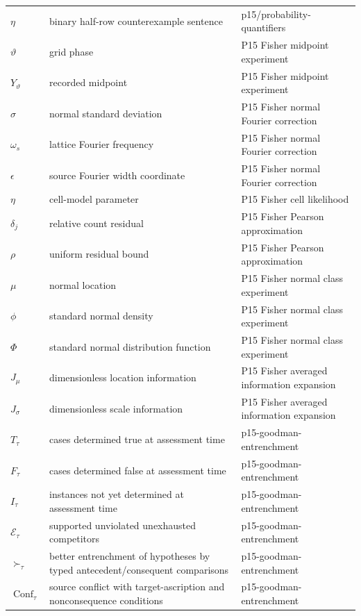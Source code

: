 \begin{longtable}{@{}p{}p{}p{}@{}}
\(\eta\) & binary half-row counterexample sentence & p15/\allowbreak{}probability-\allowbreak{}quantifiers \\
\(\vartheta\) & grid phase & P15 Fisher midpoint experiment \\
\(Y_\vartheta\) & recorded midpoint & P15 Fisher midpoint experiment \\
\(\sigma\) & normal standard deviation & P15 Fisher normal Fourier correction \\
\(\omega_s\) & lattice Fourier frequency & P15 Fisher normal Fourier correction \\
\(\epsilon\) & source Fourier width coordinate & P15 Fisher normal Fourier correction \\
\(\eta\) & cell-model parameter & P15 Fisher cell likelihood \\
\(\delta_j\) & relative count residual & P15 Fisher Pearson approximation \\
\(\rho\) & uniform residual bound & P15 Fisher Pearson approximation \\
\(\mu\) & normal location & P15 Fisher normal class experiment \\
\(\phi\) & standard normal density & P15 Fisher normal class experiment \\
\(\Phi\) & standard normal distribution function & P15 Fisher normal class experiment \\
\(J_\mu\) & dimensionless location information & P15 Fisher averaged information expansion \\
\(J_\sigma\) & dimensionless scale information & P15 Fisher averaged information expansion \\
\(T_\tau\) & cases determined true at assessment time & p15-\allowbreak{}goodman-\allowbreak{}entrenchment \\
\(F_\tau\) & cases determined false at assessment time & p15-\allowbreak{}goodman-\allowbreak{}entrenchment \\
\(I_\tau\) & instances not yet determined at assessment time & p15-\allowbreak{}goodman-\allowbreak{}entrenchment \\
\(\mathcal E_\tau\) & supported unviolated unexhausted competitors & p15-\allowbreak{}goodman-\allowbreak{}entrenchment \\
\(\succ_\tau\) & better entrenchment of hypotheses by typed antecedent/consequent comparisons & p15-\allowbreak{}goodman-\allowbreak{}entrenchment \\
\(\operatorname{Conf}_\tau\) & source conflict with target-ascription and nonconsequence conditions & p15-\allowbreak{}goodman-\allowbreak{}entrenchment \\

\end{longtable}
